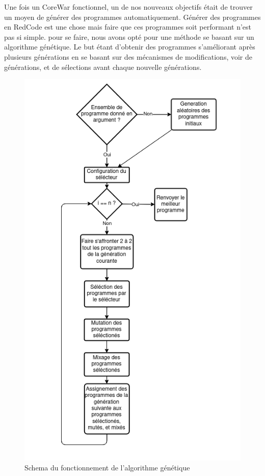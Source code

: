 \documentclass[a4paper,12pt]{article} %
\begin{document}
Une fois un CoreWar fonctionnel, un de nos nouveaux objectifs était de trouver un moyen de générer des programmes automatiquement.
Générer des programmes en RedCode est une chose mais faire que ces programmes soit performant n'est pas si simple. pour se faire, nous avons opté pour une méthode se basant sur un algorithme génétique. Le but étant d'obtenir des programmes s'améliorant après plusieurs générations en se basant sur des mécanismes de modifications, voir de générations, et de sélections avant chaque nouvelle générations.

\begin{figure}[!ht]
	\centering
	\includegraphics[height=0.5\textheight]{images/schema-algogen}
	\caption{Schema du fonctionnement de l'algorithme génétique}
\end{figure}
\end{document}
